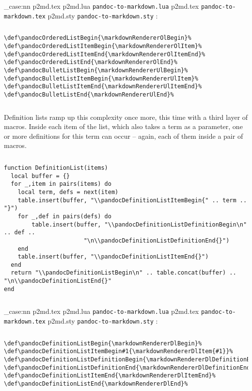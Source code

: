 \documentclass[
  digital,     %
  oneside,     %
  nosansbold,  %
  nocolorbold, %
  lof,         %
  lot,         %
]{fithesis4}
\newcommand\file[1]
  {
    \str_case:nn
      { #1 }
      {
        { p2md.lua } { \texttt{pandoc\hyp{}to\hyp{}markdown.lua} }
        { p2md.tex } { \texttt{pandoc\hyp{}to\hyp{}markdown.tex} }
        { p2md.sty } { \texttt{pandoc\hyp{}to\hyp{}markdown.sty} }
      }
  }
\begin{document}
$ $

\noindent
\file{p2md.tex}:

$ $

\noindent
\lstset{language=[plain]TeX}
\begin{lstlisting}
\def\pandocOrderedListBegin{\markdownRendererOlBegin}%
\def\pandocOrderedListItemBegin{\markdownRendererOlItem}%
\def\pandocOrderedListItemEnd{\markdownRendererOlItemEnd}%
\def\pandocOrderedListEnd{\markdownRendererOlEnd}%
\def\pandocBulletListBegin{\markdownRendererUlBegin}%
\def\pandocBulletListItemBegin{\markdownRendererUlItem}%
\def\pandocBulletListItemEnd{\markdownRendererUlItemEnd}%
\def\pandocBulletListEnd{\markdownRendererUlEnd}%
\end{lstlisting}

$ $

\noindent
Definition lists ramp up this complexity once more, this time with a third layer of macros. Inside  each item of the list, which also takes a term as a parameter, one or more definitions for this term can occur -- again, each of them inside a pair of macros.

$ $

\noindent
\lstset{language=[5.3]Lua}
\begin{lstlisting}
function DefinitionList(items)
  local buffer = {}
  for _,item in pairs(items) do
    local term, defs = next(item)
    table.insert(buffer, "\\pandocDefinitionListItemBegin{" .. term .. "}")
    for _,def in pairs(defs) do
        table.insert(buffer, "\\pandocDefinitionListDefinitionBegin\n" .. def ..
                       "\n\\pandocDefinitionListDefinitionEnd{}")
    end
    table.insert(buffer, "\\pandocDefinitionListItemEnd{}")
  end
  return "\\pandocDefinitionListBegin\n" .. table.concat(buffer) .. "\n\\pandocDefinitionListEnd{}"
end
\end{lstlisting}

$ $

\noindent
\file{p2md.tex}:

$ $

\noindent
\lstset{language=[plain]TeX}
\begin{lstlisting}
\def\pandocDefinitionListBegin{\markdownRendererDlBegin}%
\def\pandocDefinitionListItemBegin#1{\markdownRendererDlItem{#1}}%
\def\pandocDefinitionListDefinitionBegin{\markdownRendererDlDefinitionBegin}%
\def\pandocDefinitionListDefinitionEnd{\markdownRendererDlDefinitionEnd}%
\def\pandocDefinitionListItemEnd{\markdownRendererDlItemEnd}%
\def\pandocDefinitionListEnd{\markdownRendererDlEnd}%
\end{lstlisting}
\end{document}
